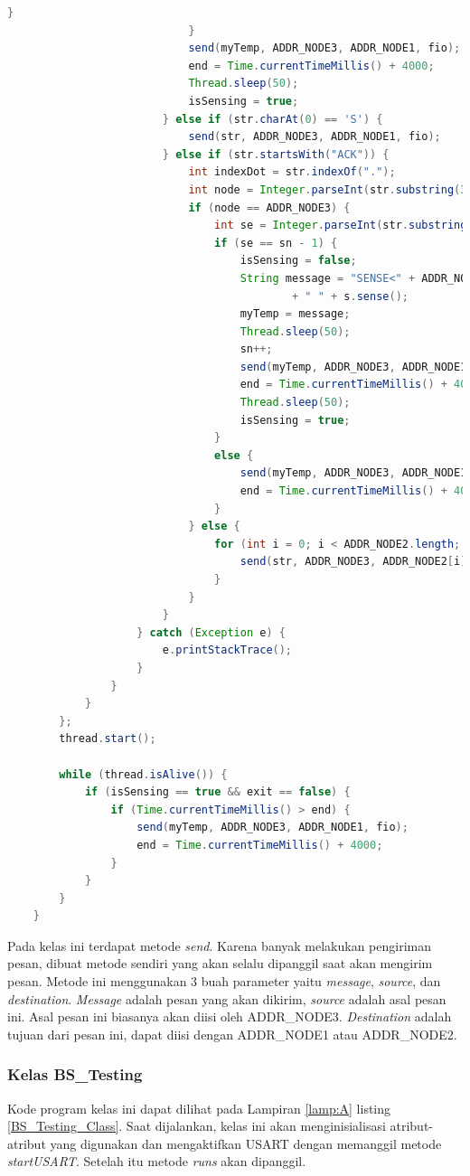 \begin{lstlisting}[label=send_receive_ns, language=Java, caption=Metode send\_receive pada kelas NS, numbers=none]
								}
							}
							send(myTemp, ADDR_NODE3, ADDR_NODE1, fio);
							end = Time.currentTimeMillis() + 4000;
							Thread.sleep(50);
							isSensing = true;
						} else if (str.charAt(0) == 'S') {
							send(str, ADDR_NODE3, ADDR_NODE1, fio);
						} else if (str.startsWith("ACK")) {
							int indexDot = str.indexOf(".");
							int node = Integer.parseInt(str.substring(3, indexDot));
							if (node == ADDR_NODE3) {
								int se = Integer.parseInt(str.substring(indexDot + 1));
								if (se == sn - 1) {
									isSensing = false;
									String message = "SENSE<" + ADDR_NODE3 + ">" + sn + "?" + Time.currentTimeMillis()
											+ " " + s.sense();
									myTemp = message;
									Thread.sleep(50);
									sn++;
									send(myTemp, ADDR_NODE3, ADDR_NODE1, fio);
									end = Time.currentTimeMillis() + 4000;
									Thread.sleep(50);
									isSensing = true;
								}
								else {
									send(myTemp, ADDR_NODE3, ADDR_NODE1, fio);
									end = Time.currentTimeMillis() + 4000;
								}
							} else {
								for (int i = 0; i < ADDR_NODE2.length; i++) {
									send(str, ADDR_NODE3, ADDR_NODE2[i], fio);
								}
							}
						}
					} catch (Exception e) {
						e.printStackTrace();
					}
				}
			}
		};
		thread.start();

		while (thread.isAlive()) {
			if (isSensing == true && exit == false) {
				if (Time.currentTimeMillis() > end) {
					send(myTemp, ADDR_NODE3, ADDR_NODE1, fio);
					end = Time.currentTimeMillis() + 4000;
				}
			}
		}
	}
\end{lstlisting}
Pada kelas ini terdapat metode \textit{send}. Karena banyak melakukan pengiriman pesan, dibuat metode sendiri yang akan selalu dipanggil saat akan mengirim pesan. Metode ini menggunakan 3 buah parameter yaitu \textit{message}, \textit{source}, dan \textit{destination}. \textit{Message} adalah pesan yang akan dikirim, \textit{source} adalah asal pesan ini. Asal pesan ini biasanya akan diisi oleh ADDR\_NODE3. \textit{Destination} adalah tujuan dari pesan ini, dapat diisi dengan ADDR\_NODE1 atau ADDR\_NODE2.

\subsubsection{Kelas BS\_Testing}
Kode program kelas ini dapat dilihat pada Lampiran \ref{lamp:A} listing \ref{BS_Testing_Class}. Saat dijalankan, kelas ini akan menginisialisasi atribut-atribut yang digunakan dan mengaktifkan USART dengan memanggil metode \textit{startUSART}. Setelah itu metode \textit{runs} akan dipanggil.

